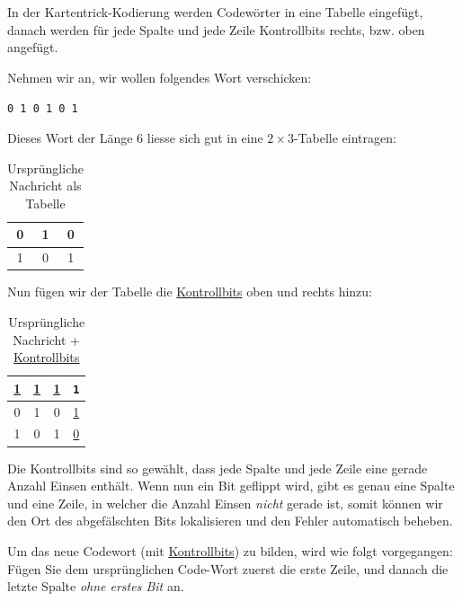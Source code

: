 \begin{mydefinition}[Kartentrick]\label{def:kartentrick}
In der Kartentrick-Kodierung werden Codewörter in eine Tabelle eingefügt, danach werden für jede Spalte und jede Zeile Kontrollbits rechts, bzw. oben angefügt.

Nehmen wir an, wir wollen folgendes Wort verschicken:

\texttt{0 1 0 1 0 1}

Dieses Wort der Länge 6 liesse sich gut in eine $2\times3$-Tabelle eintragen:

\begin{table}[H]
    \centering
    \begin{tabular}{c|c|c}
        0 & 1 & 0 \\\midrule
        1 & 0 & 1 \\
    \end{tabular}
    \caption{Ursprüngliche Nachricht als Tabelle}
    \label{tab:ex-zauberer}
\end{table}

Nun fügen wir der Tabelle die \underline{Kontrollbits} oben und rechts hinzu:
\begin{table}[H]
    \centering
    \begin{tabular}{c|c|c||c}
        \underline{1} & \underline{1} & \underline{1} & \texttt{1}    \\\midrule\midrule
        0             & 1             & 0             & \underline{1} \\\midrule
        1             & 0             & 1             & \underline{0} \\
    \end{tabular}
    \caption{Ursprüngliche Nachricht + \underline{Kontrollbits}}
    \label{tab:ex-zauberer-parity}
\end{table}

Die Kontrollbits sind so gewählt, dass jede Spalte und jede Zeile eine gerade Anzahl Einsen enthält. Wenn nun ein Bit geflippt wird, gibt es genau eine Spalte und eine Zeile, in welcher die Anzahl Einsen \textit{nicht} gerade ist, somit können wir den Ort des abgefälschten Bits lokalisieren und den Fehler automatisch beheben.

Um das neue Codewort (mit \underline{Kontrollbits}) zu bilden, wird wie folgt vorgegangen: Fügen Sie dem ursprünglichen Code-Wort zuerst die erste Zeile, und danach die letzte Spalte \textit{ohne erstes Bit} an.

\end{mydefinition}

